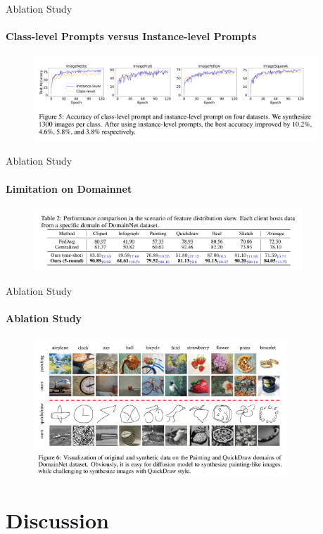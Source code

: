 \documentclass{beamer}
\begin{document}
\begin{frame}{Ablation Study}
\framesubtitle{Class-level Prompts versus Instance-level Prompts}
	\begin{figure}
	\centering
	\includegraphics[width=0.95\textwidth]
	{assets/ablation}
	\end{figure}
\end{frame}



\begin{frame}{Ablation Study}
\framesubtitle{Limitation on Domainnet}
	\begin{figure}
	\centering
	\includegraphics[width=0.9\textwidth]
	{assets/domainnet}
	\end{figure}
\end{frame}

\begin{frame}{Ablation Study}
\framesubtitle{Ablation Study}
	\begin{figure}
	\centering
	\includegraphics[width=0.85\textwidth]
	{assets/quickdraw}
	\end{figure}
\end{frame}

\section{Discussion}
\end{document}
